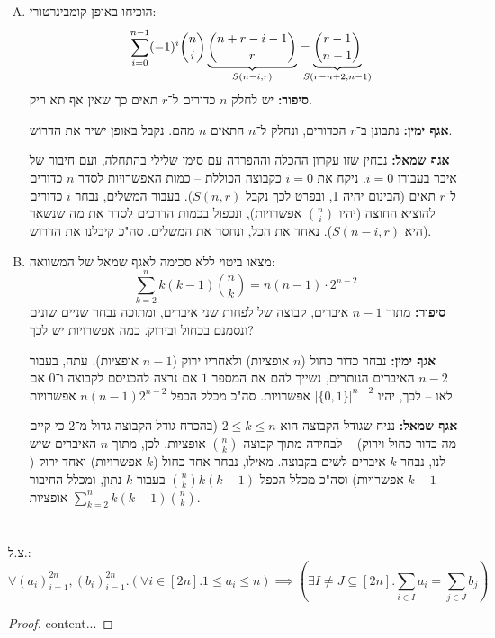 \documentclass[]{article}
\newcommand\bink      {\binom{n}{k}}
\begin{document}
	\section{}
	\begin{enumerate}[(A)]
		\item הוכיחו באופן קומבינרטורי: 
		\[ \sum_{i = 0}^{n - 1}(-1)^{i} \binom{n}{i} \underbrace{\binom{n + r - i - 1}{r}}_{S(n - i, r)} = \underbrace{\binom{r - 1}{n - 1}}_{\mathclap{S(r - n + 2, n - 1)}} \]
		\textbf{סיפור: }יש לחלק $n$ כדורים ל־$r$ תאים כך שאין אף תא ריק. 
		
		\textbf{אגף ימין: }נתבונן ב־$r$ הכדורים, ונחלק ל־$n$ התאים $n$ מהם. נקבל באופן ישיר את הדרוש. 
				
		\textbf{אגף שמאל: }נבחין שזו עקרון ההכלה וההפרדה עם סימן שלילי בהתחלה, ועם חיבור של איבר בעבורו $i = 0$. ניקח את $i = 0$ כקבוצה הכוללת – כמות האפשרויות לסדר $n$ כדורים ל־$r$ תאים (הבינום יהיה 1, ובפרט לכך נקבל $S(n, r)$). בעבור המשלים, נבחר $i$ כדורים להוציא החוצה (יהיו $\binom{n}{i}$ אפשרויות), ונכפול בכמות הדרכים לסדר את מה שנשאר (היא $S(n - i, r)$). נאחד את הכל, ונחסר את המשלים. סה"כ קיבלנו את הדרוש. 
		
		\item מצאו ביטוי ללא סכימה לאגף שמאל של המשוואה: 
		\[ \sum_{k = 2}^{n} k(k - 1)\bink = n(n - 1) \cdot 2^{n - 2} \]
		\textbf{סיפור: }מתוך $n - 1$ איברים, קבוצה של לפחות שני איברים, ומתוכה נבחר שניים שונים ונסמנם בכחול ובירוק. כמה אפשרויות יש לכך? 
		
		\textbf{אגף ימין: }נבחר כדור כחול ($n$ אופציות) ולאחריו ירוק ($n - 1$ אופציות). עתה, בעבור $n - 2$ האיברים הנותרים, נשייך להם את המספר $1$ אם נרצה להכניסם לקבוצה ו־$0$ אם לאו – לכך, יהיו $|\{0, 1\}|^{n - 2}$ אפשרויות. סה"כ מכלל הכפל $n(n - 1)2^{n - 2}$ אפשרויות. 
		
		\textbf{אגף שמאל: }נניח שגודל הקבוצה הוא $2 \le k \le n$ (בהכרח גודל הקבוצה גדול מ־2 כי קיים מה כדור כחול וירוק) – לבחירה מתוך קבוצה $\bink$ אופציות. לכן, מתוך $n$ האיברים שיש לנו, נבחר $k$ איברים לשים בקבוצה. מאילו, נבחר אחד כחול ($k$ אפשרויות) ואחד ירוק ($k - 1$ אפשרויות) וסה"כ מכלל הכפל $\binom{n}{k}k(k - 1)$ בעבור $k$ נתון, ומכלל החיבור $\sum_{k = 2}^{n}k(k - 1)\bink$ אופציות. 
		
	\end{enumerate}
	\section{}
	צ.ל.: 
	\[ \textstyle \forall (a_i)_{i = 1}^{2n}, (b_i)_{i = 1}^{2n}. (\forall i \in [2n]. 1 \le a_i \le n) \implies (\exists I \neq J \subseteq [2n]. \sum_{i \in I} a_i = \sum_{j \in J}b_j) \]
	\begin{proof}
		content...
	\end{proof}
	
\end{document}
